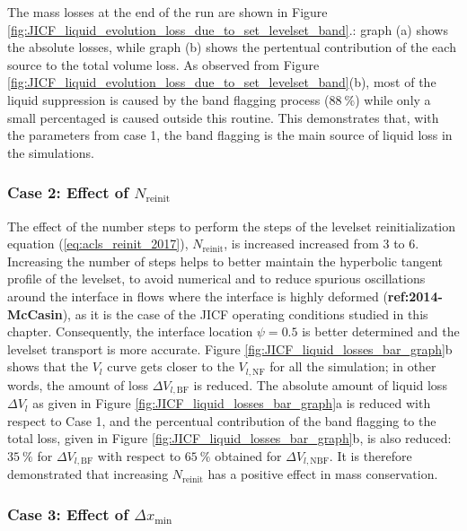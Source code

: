 The mass losses at the end of the run are shown in Figure \ref{fig:JICF_liquid_evolution_loss_due_to_set_levelset_band}.: graph (a) shows the absolute losses, while graph (b) shows the pertentual contribution of the each source to the total volume loss. As observed from Figure \ref{fig:JICF_liquid_evolution_loss_due_to_set_levelset_band}(b), most of the liquid suppression is caused by the band flagging process ($88~\%$) while only a small percentaged is caused outside this routine. This demonstrates that, with the parameters from case 1, the band flagging is the main source of liquid loss in the simulations.

\subsubsection*{Case 2: Effect of $N_\mathrm{reinit}$}



The effect of the number steps to perform the steps of the levelset reinitialization equation (\ref{eq:acls_reinit_2017}), $N_\mathrm{reinit}$, is increased increased from 3 to 6. Increasing the number of steps helps to better maintain the hyperbolic tangent profile of the levelset, to avoid numerical and to reduce spurious oscillations around the interface in flows where the interface is highly deformed (\textbf{ref:2014-McCasin}), as it is the case of the JICF operating conditions studied in this chapter. Consequently, the interface location $\psi = 0.5$ is better determined and the levelset transport is more accurate. Figure \ref{fig:JICF_liquid_losses_bar_graph}b shows that the $V_l$ curve gets closer to the $V_{l,\mathrm{NF}}$ for all the simulation; in other words, the amount of loss $\Delta V_{l,\mathrm{BF}}$ is reduced. The absolute amount of liquid loss $\Delta V_l$ as given in Figure \ref{fig:JICF_liquid_losses_bar_graph}a is reduced with respect to Case 1, and the percentual contribution of the band flagging to the total loss, given in Figure \ref{fig:JICF_liquid_losses_bar_graph}b, is also reduced: $35~\%$ for $\Delta V_{l,\mathrm{BF}}$ with respect to $65~\%$ obtained for $\Delta V_{l,\mathrm{NBF}}$. It is therefore demonstrated that increasing $N_\mathrm{reinit}$ has a positive effect in mass conservation.


\subsubsection*{Case 3: Effect of $\Delta x_\mathrm{min}$}

